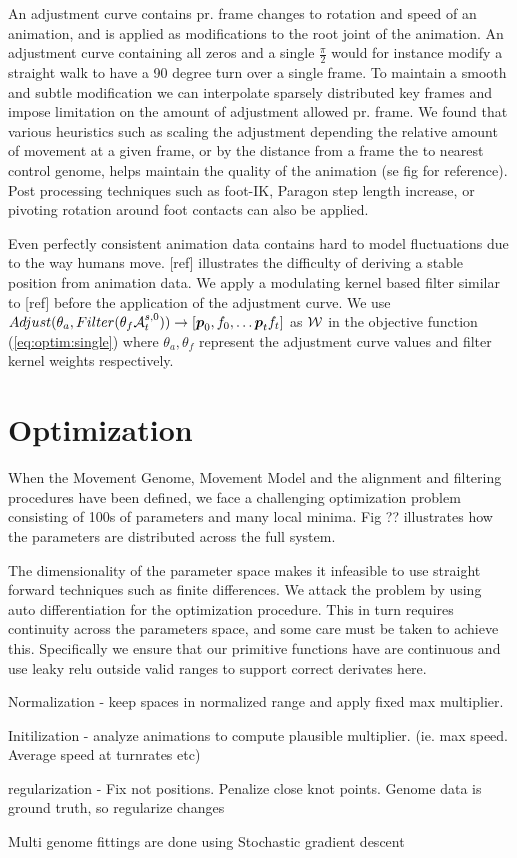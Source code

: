 An adjustment curve contains pr. frame changes to rotation and speed of an animation, and is applied as modifications to the root joint of the animation. An adjustment curve containing all zeros and a single $\frac{\pi}{2}$ would for instance modify a straight walk to have a 90 degree turn over a single frame. To maintain a smooth and subtle modification we can interpolate sparsely distributed key frames and impose limitation on the amount of adjustment allowed pr. frame. We found that various heuristics such as scaling the adjustment depending the relative amount of movement at a given frame, or by the distance from a frame the to nearest control genome, helps maintain the quality of the animation (se fig for reference). Post processing techniques such as foot-IK, Paragon step length increase, or pivoting rotation around foot contacts can also be applied.

Even perfectly consistent animation data contains hard to model fluctuations due to the way humans move. [ref] illustrates the difficulty of deriving a stable position from animation data. We apply a modulating kernel based filter similar to [ref] before the application of the adjustment curve. We use $Adjust(\theta_a,Filter(\theta_f\mathcal{A}^{s,0}_t))\rightarrow{}[\boldsymbol{p }_0,f_0, \ldots \boldsymbol{p }_tf_t]$ as $\mathcal{W}$ in the objective function (\ref{eq:optim:single}) where $\theta_a, \theta_f$ represent the adjustment curve values and filter kernel weights respectively.

\section{Optimization}
When the Movement Genome, Movement Model and the alignment and filtering procedures have been defined, we face a challenging optimization problem consisting of 100s of parameters and many local minima. Fig ?? illustrates how the parameters are distributed across the full system.

The dimensionality of the parameter space makes it infeasible to use straight forward techniques such as finite differences. We attack the problem by using auto differentiation for the optimization procedure. This in turn requires continuity across the parameters space, and some care must be taken to achieve this. Specifically we ensure that our primitive functions have are continuous and use leaky relu outside valid ranges to support correct derivates here. 



Normalization - keep spaces in normalized range and apply fixed max multiplier.

Initilization - analyze animations to compute plausible multiplier. (ie. max speed. Average speed at turnrates etc)

regularization - Fix not positions. Penalize close knot points.
Genome data is ground truth, so regularize changes

Multi genome fittings are done using Stochastic gradient descent
